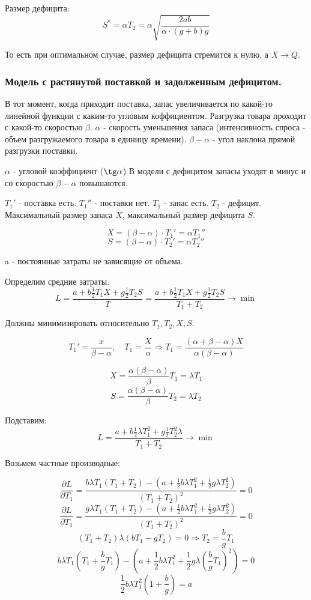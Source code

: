 \documentclass[aps,%
12pt,%
final,%
oneside,
onecolumn,%
musixtex, %
superscriptaddress,%
centertags]{article} %
\theoremstyle{plain}
\begin{document}
Размер дефицита:
$$ S^* = \alpha T_2 = \alpha \sqrt{\frac{2ab}{\alpha \cdot (g+b) g}}$$

То есть при оптимальном случае, размер дефицита стремится к нулю, а $X \to Q$.

\subsubsection{Модель с растянутой поставкой и задолженным дефицитом.}

В тот момент, когда приходит поставка, запас увеличивается по какой-то линейной функции с каким-то угловым коффициентом. Разгрузка товара проходит с какой-то скоростью $\beta$. $\alpha$ - скорость уменьшения запаса (интенсивность спроса - объем разгружаемого товара в единицу времени). $\beta - \alpha$ - угол наклона прямой разгрузки поставки.

$\alpha$ - угловой коэффициент ($\tg \alpha$)
В модели с дефицитом запасы уходят в минус и со скоростью $\beta - \alpha$ повышаются.


$T_1'$ - поставка есть. $T_1''$ - поставки нет. $T_1$ - запас есть. $T_2$ - дефицит.
Максимальный размер запаса $X$, максимальный размер дефицита $S$. 

$$ X = (\beta-\alpha) \cdot T_1' = \alpha T_1''$$
$$ S = (\beta-\alpha) \cdot T_2' = \alpha T_2''$$

a - постоянные затраты не зависящие от объема.

Определим средние затраты.
$$L = \frac{a+b\frac{1}{2}T_1X + g \frac{1}{2}T_2 S}{T} = \frac{a+b\frac{1}{2}T_1X + g \frac{1}{2}T_2 S}{T_1 + T_2} \to \min$$

Должны минимизировать относительно $T_1,T_2,X,S$.

$$T_1' = \frac{x}{\beta - \alpha}, \quad T_1 = \frac{X}{\alpha} \Rightarrow T_1 = \frac{(\alpha+\beta-\alpha)X}{\alpha(\beta-\alpha)}$$

$$ X = \frac{\alpha(\beta-\alpha)}{\beta}T_1 = \lambda T_1 $$
$$ S = \frac{\alpha(\beta-\alpha)}{\beta}T_2 = \lambda T_2 $$

Подставим:
$$ L = \frac{a+b\frac{1}{2}\lambda T_1^2 + g \frac{1}{2}T_2^2 \lambda}{T_1 + T_2} \to \min $$

Возьмем частные производные:

$$ \frac{\partial L}{\partial T_1} = \frac{b\lambda T_1(T_1+T_2) - (a + \frac{1}{2}b\lambda T_1^2 + \frac{1}{2}g\lambda T_2^2)}{(T_1+T_2)^2} = 0$$
$$ \frac{\partial L}{\partial T_1} = \frac{g\lambda T_1(T_1+T_2) - (a + \frac{1}{2}b\lambda T_1^2 + \frac{1}{2}g\lambda T_2^2)}{(T_1+T_2)^2} = 0$$
$$ (T_1+T_2) \lambda (bT_1 - gT_2) =0 \Rightarrow T_2 = \frac{b}{g}T_1$$
$$ b\lambda T_1(T_1+\frac{b}{g}T_1) - (a + \frac{1}{2}b\lambda T_1^2 + \frac{1}{2}g\lambda (\frac{b}{g}T_1)^2) = 0$$
$$ \frac{1}{2}b\lambda T_1^2 (1+\frac{b}{g}) = a$$
\end{document}
